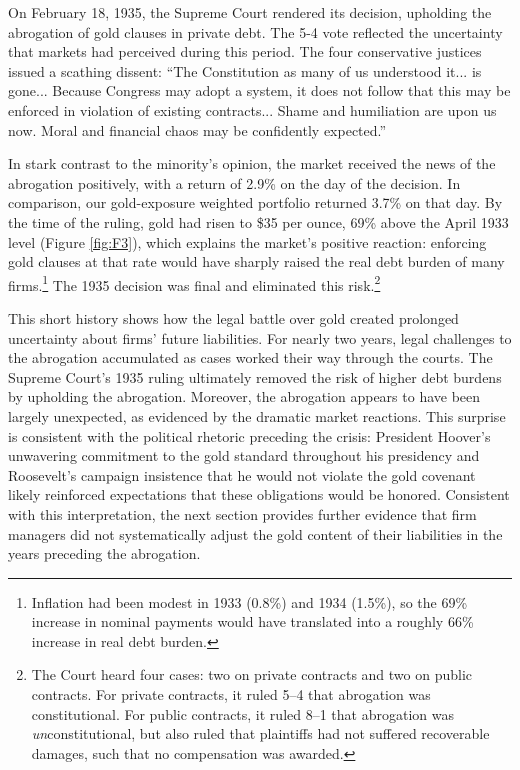 On February 18, 1935, the Supreme Court rendered its decision, upholding the abrogation of gold clauses in private debt. The 5-4 vote reflected the uncertainty that markets had perceived during this period. The four conservative justices issued a scathing dissent: ``The Constitution as many of us understood it... is gone... Because Congress may adopt a system, it does not follow that this may be enforced in violation of existing contracts... Shame and humiliation are upon us now. Moral and financial chaos may be confidently expected.'' 

In stark contrast to the minority's opinion, the market received the news of the abrogation positively, with a return of 2.9\% on the day of the decision. In comparison, our gold-exposure weighted portfolio returned 3.7\% on that day. By the time of the ruling, gold had risen to \$35 per ounce, 69\% above the April 1933 level (Figure \ref{fig:F3}), which explains the market's positive reaction: enforcing gold clauses at that rate would have sharply raised the real debt burden of many firms.\footnote{Inflation had been modest in 1933 (0.8\%) and 1934 (1.5\%), so the 69\% increase in nominal payments would have translated into a roughly 66\% increase in real debt burden.} The 1935 decision was final and eliminated this risk.\footnote{The Court heard four cases: two on private contracts and two on public contracts. For private contracts, it ruled 5–4 that abrogation was constitutional. For public contracts, it ruled 8–1 that abrogation was \textit{un}constitutional, but also ruled that plaintiffs had not suffered recoverable damages, such that no compensation was awarded.}

This short history shows how the legal battle over gold created prolonged uncertainty about firms' future liabilities. For nearly two years, legal challenges to the abrogation accumulated as cases worked their way through the courts. The Supreme Court's 1935 ruling ultimately removed the risk of higher debt burdens by upholding the abrogation. Moreover, the abrogation appears to have been largely unexpected, as evidenced by the dramatic market reactions. This surprise is consistent with the political rhetoric preceding the crisis: President Hoover's unwavering commitment to the gold standard throughout his presidency and Roosevelt's campaign insistence that he would not violate the gold covenant likely reinforced expectations that these obligations would be honored. Consistent with this interpretation, the next section provides further evidence that firm managers did not systematically adjust the gold content of their liabilities in the years preceding the abrogation.

